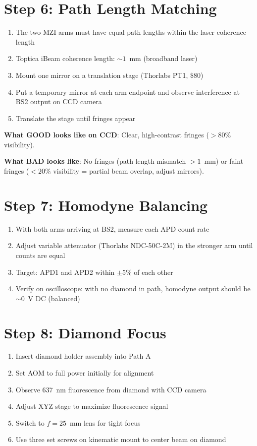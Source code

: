 \documentclass[11pt,a4paper,openany]{book}
\begin{document}
\section{Step 6: Path Length Matching}

\begin{enumerate}[nosep]
  \item The two MZI arms must have equal path lengths within the laser coherence length
  \item Toptica iBeam coherence length: ${\sim}1$~mm (broadband laser)
  \item Mount one mirror on a translation stage (Thorlabs PT1, \$80)
  \item Put a temporary mirror at each arm endpoint and observe interference at BS2 output on CCD camera
  \item Translate the stage until fringes appear
\end{enumerate}

\noindent
\textbf{What GOOD looks like on CCD}: Clear, high-contrast fringes ($> 80\%$ visibility).

\noindent
\textbf{What BAD looks like}: No fringes (path length mismatch $> 1$~mm) or faint fringes ($< 20\%$ visibility = partial beam overlap, adjust mirrors).

\section{Step 7: Homodyne Balancing}

\begin{enumerate}[nosep]
  \item With both arms arriving at BS2, measure each APD count rate
  \item Adjust variable attenuator (Thorlabs NDC-50C-2M) in the stronger arm until counts are equal
  \item Target: APD1 and APD2 within $\pm 5\%$ of each other
  \item Verify on oscilloscope: with no diamond in path, homodyne output should be ${\sim}0$~V DC (balanced)
\end{enumerate}

\section{Step 8: Diamond Focus}

\begin{enumerate}[nosep]
  \item Insert diamond holder assembly into Path A
  \item Set AOM to full power initially for alignment
  \item Observe 637~nm fluorescence from diamond with CCD camera
  \item Adjust XYZ stage to maximize fluorescence signal
  \item Switch to $f = 25$~mm lens for tight focus
  \item Use three set screws on kinematic mount to center beam on diamond
\end{enumerate}
\end{document}
